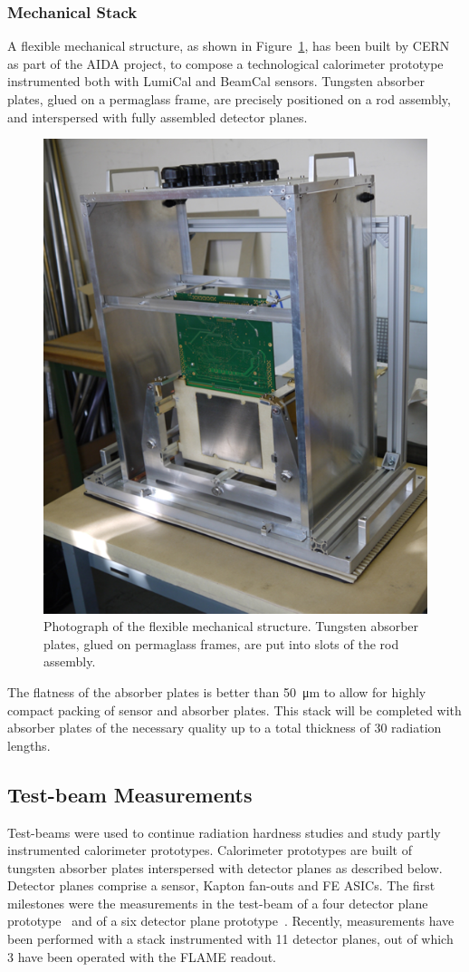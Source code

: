 \subsubsection{Mechanical Stack}

A flexible mechanical structure, as shown in Figure~\ref{fig:mechanical_structure}, has been 
built by CERN as part of the AIDA project,
to compose a technological 
calorimeter prototype instrumented both with LumiCal and BeamCal sensors. 
Tungsten absorber plates, glued on a permaglass
frame, are precisely
positioned on a rod assembly, and interspersed with fully assembled detector planes.
\begin{figure}
    \centering
    \includegraphics[width=0.6\columnwidth,]{Calorimeter/FCAL/figs/mechanical_structure_2}
    \caption{Photograph of the flexible mechanical structure. Tungsten absorber plates, glued on permaglass frames, are put into slots of the
rod assembly.}
    \label{fig:mechanical_structure}
\end{figure}
The flatness of the absorber plates is better than \SI{50}{\micro\meter} to allow for highly compact 
packing of sensor and absorber plates. This stack will be completed 
with absorber plates of the necessary quality up to a total thickness of 30 radiation lengths.

\subsection{Test-beam Measurements}

Test-beams were used to continue radiation hardness studies and study partly instrumented calorimeter prototypes. 
Calorimeter prototypes are built of tungsten absorber plates interspersed with detector  planes as described below. Detector planes comprise a sensor, Kapton fan-outs and FE ASICs.
The first milestones were the measurements in the test-beam of a four
detector plane prototype~\cite{Abramowicz:2017cer} and of a six detector plane prototype~\cite{Abramowicz:2018vwb}. 
Recently, measurements have been performed with a stack instrumented with 11 detector planes, out of which 3 have been operated with the FLAME readout.   

